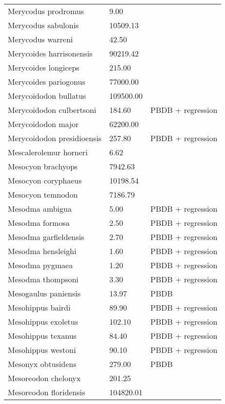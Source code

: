 \begin{longtable}{p{} p{} p{}}
    Merycodus prodromus & 9.00 & \cite{Kelly1954} \\ 
    Merycodus sabulonis & 10509.13 & \cite{Tomiya2013} \\ 
    Merycodus warreni & 42.50 & \cite{Baskin2004} \\ 
    Merycoides harrisonensis & 90219.42 & \cite{Tomiya2013} \\ 
    Merycoides longiceps & 215.00 & \cite{Stock1948} \\ 
    Merycoides pariogonus & 77000.00 & \cite{McKenna2011} \\ 
    Merycoidodon bullatus & 109500.00 & \cite{McKenna2011} \\ 
    Merycoidodon culbertsoni & 184.60 & PBDB + regression \\ 
    Merycoidodon major & 62200.00 & \cite{McKenna2011} \\ 
    Merycoidodon presidioensis & 257.80 & PBDB + regression \\ 
    Mescalerolemur horneri & 6.62 & \cite{MacIntyre1966} \\ 
    Mesocyon brachyops & 7942.63 & \cite{Tomiya2013} \\ 
    Mesocyon coryphaeus & 10198.54 & \cite{Tomiya2013} \\ 
    Mesocyon temnodon & 7186.79 & \cite{Tomiya2013} \\ 
    Mesodma ambigua & 5.00 & PBDB + regression \\ 
    Mesodma formosa & 2.50 & PBDB + regression \\ 
    Mesodma garfieldensis & 2.70 & PBDB + regression \\ 
    Mesodma hensleighi & 1.60 & PBDB + regression \\ 
    Mesodma pygmaea & 1.20 & PBDB + regression \\ 
    Mesodma thompsoni & 3.30 & PBDB + regression \\ 
    Mesogaulus paniensis & 13.97 & PBDB \\ 
    Mesohippus bairdi & 89.90 & PBDB + regression \\ 
    Mesohippus exoletus & 102.10 & PBDB + regression \\ 
    Mesohippus texanus & 84.40 & PBDB + regression \\ 
    Mesohippus westoni & 90.10 & PBDB + regression \\ 
    Mesonyx obtusidens & 279.00 & PBDB \\ 
    Mesoreodon chelonyx & 201.25 & \cite{Bever2003} \\ 
    Mesoreodon floridensis & 104820.01 & \cite{Tomiya2013} \\ 

\end{longtable}
